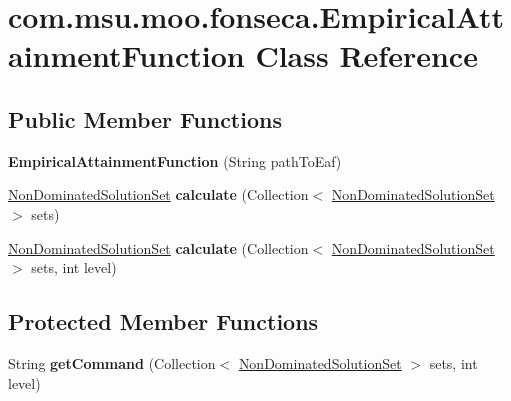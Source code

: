 \hypertarget{classcom_1_1msu_1_1moo_1_1fonseca_1_1EmpiricalAttainmentFunction}{\section{com.\-msu.\-moo.\-fonseca.\-Empirical\-Attainment\-Function Class Reference}
\label{classcom_1_1msu_1_1moo_1_1fonseca_1_1EmpiricalAttainmentFunction}
}
\subsection*{Public Member Functions}
\begin{DoxyCompactItemize}
\item 
\hypertarget{classcom_1_1msu_1_1moo_1_1fonseca_1_1EmpiricalAttainmentFunction_a7aac430886347ff6210a851088bf909f}{{\bfseries Empirical\-Attainment\-Function} (String path\-To\-Eaf)}\label{classcom_1_1msu_1_1moo_1_1fonseca_1_1EmpiricalAttainmentFunction_a7aac430886347ff6210a851088bf909f}

\item 
\hypertarget{classcom_1_1msu_1_1moo_1_1fonseca_1_1EmpiricalAttainmentFunction_a7e269db8ed22c9cbfa3b0d363ef559e4}{\hyperlink{classcom_1_1msu_1_1moo_1_1model_1_1solution_1_1NonDominatedSolutionSet}{Non\-Dominated\-Solution\-Set} {\bfseries calculate} (Collection$<$ \hyperlink{classcom_1_1msu_1_1moo_1_1model_1_1solution_1_1NonDominatedSolutionSet}{Non\-Dominated\-Solution\-Set} $>$ sets)}\label{classcom_1_1msu_1_1moo_1_1fonseca_1_1EmpiricalAttainmentFunction_a7e269db8ed22c9cbfa3b0d363ef559e4}

\item 
\hypertarget{classcom_1_1msu_1_1moo_1_1fonseca_1_1EmpiricalAttainmentFunction_a5b92af550ec7b9478d9350ca6a14edf8}{\hyperlink{classcom_1_1msu_1_1moo_1_1model_1_1solution_1_1NonDominatedSolutionSet}{Non\-Dominated\-Solution\-Set} {\bfseries calculate} (Collection$<$ \hyperlink{classcom_1_1msu_1_1moo_1_1model_1_1solution_1_1NonDominatedSolutionSet}{Non\-Dominated\-Solution\-Set} $>$ sets, int level)}\label{classcom_1_1msu_1_1moo_1_1fonseca_1_1EmpiricalAttainmentFunction_a5b92af550ec7b9478d9350ca6a14edf8}

\end{DoxyCompactItemize}
\subsection*{Protected Member Functions}
\begin{DoxyCompactItemize}
\item 
\hypertarget{classcom_1_1msu_1_1moo_1_1fonseca_1_1EmpiricalAttainmentFunction_a2de51b05b6e7db249d40a45c868b7d53}{String {\bfseries get\-Command} (Collection$<$ \hyperlink{classcom_1_1msu_1_1moo_1_1model_1_1solution_1_1NonDominatedSolutionSet}{Non\-Dominated\-Solution\-Set} $>$ sets, int level)}\label{classcom_1_1msu_1_1moo_1_1fonseca_1_1EmpiricalAttainmentFunction_a2de51b05b6e7db249d40a45c868b7d53}

\end{DoxyCompactItemize}

